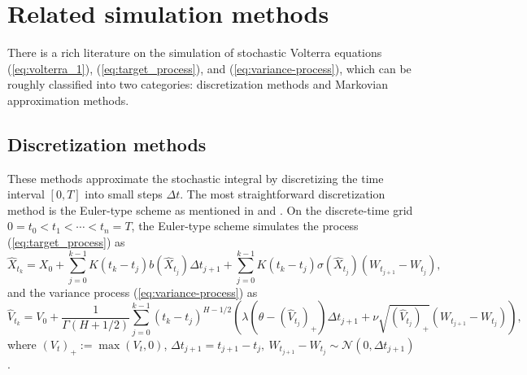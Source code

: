 \documentclass[11pt]{article}%
\theoremstyle{definition}
\begin{document}



\section{Related simulation methods}\label{sec:related_work_simulation}

There is a rich literature on the simulation of stochastic Volterra equations (\ref{eq:volterra_1}), (\ref{eq:target_process}), and (\ref{eq:variance-process}), which can be roughly classified into two categories: discretization methods and Markovian approximation methods.

\subsection{Discretization methods}

These methods approximate the stochastic integral by discretizing the time interval \([0,T]\) into small steps \(\Delta t\). The most straightforward discretization method is the Euler-type scheme as mentioned in \cite{richard2021} and \cite{richard2023roughsimu}. On the discrete-time grid \(0 = t_0 < t_1 < \cdots < t_n = T\), the Euler-type scheme simulates the process (\ref{eq:target_process}) as
\begin{equation}
    \widehat{X}_{t_{k}} = X_{0} + \sum_{j=0}^{k-1} K(t_{k}-t_j)b(\widehat{X}_{t_j})\Delta t_{j+1} + \sum_{j=0}^{k-1} K(t_{k}-t_j)\sigma(\widehat{X}_{t_j})(W_{t_{j+1}} - W_{t_j}),\label{eq:euler_scheme_target}
\end{equation}
and the variance process (\ref{eq:variance-process}) as
\begin{equation}
    \widehat{V}_{t_k} = V_0 + \frac{1}{\Gamma(H+1/2)} \sum_{j=0}^{k-1} (t_{k}-t_j)^{H-1/2}\left(\lambda(\theta - (\widehat{V}_{t_j})_+)\Delta t_{j+1} + \nu\sqrt{(\widehat{V}_{t_j})_+}(W_{t_{j+1}} - W_{t_j})\right),\label{eq:euler_scheme_variance}
\end{equation}
where \((V_t)_+ := \max(V_t,0)\), \(\Delta t_{j+1} = t_{j+1} - t_j,\ W_{t_{j+1}} - W_{t_j} \sim \mathcal{N}(0,\Delta t_{j+1})\). 
\end{document}
